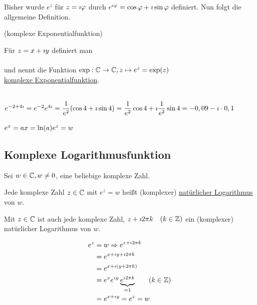 Bisher wurde $e^z$ für $z=\imath \varphi$ durch $e^{\imath \varphi} = \cos\varphi+\imath \sin\varphi$ {\flqq definiert\frqq}. Nun folgt die allgemeine Definition.

\Def (komplexe Exponentialfunktion)

Für $z=x+\imath y$ definiert man\\
\\
und nennt die Funktion $\exp:\mathbb{C}\to\mathbb{C}, z\mapsto e^z=\exp(z)$\\
\underline{komplexe Exponentialfunktion}.

\Bsp \quad\\
$e^{-2+4\imath }=e^{-2}e^{4\imath }=\dfrac{1}{e^2}(\cos4+\imath \sin4)=\dfrac{1}{e^2}\cos4+\imath \dfrac{1}{e^2}\sin4=-0,09-\imath \cdot0,1$

$e^x=a\\
x=\ln(a)\\
e^z=w$

\clearpage
\subsection{Komplexe Logarithmusfunktion}

\Def Sei $w\in\mathbb{C}, w\ne0$, eine beliebige komplexe Zahl.

Jede komplexe Zahl $z\in\mathbb{C}$ mit $e^z=w$ heißt (komplexer) \underline{natürlicher Logarithmus} von $w$.

\Bem Mit $z\in\mathbb{C}$ ist auch jede komplexe Zahl, $z+\imath 2\pi k\quad(k\in\mathbb{Z})$ ein (komplexer) natürlicher Logarithmus von $w$.

\begin{align*}
e^z&=w\Rightarrow e^{z+\imath 2\pi k}\\
&=e^{x+\imath y+\imath 2\pi k}\\
&=e^{x+\imath (y+2\pi k)}\\
&=e^xe^{\imath y}\underbrace{e^{\imath 2\pi k}}_{=1}\qquad(k\in\mathbb{Z})\\
&=e^{x+\imath y}=e^z=w
\end{align*}


